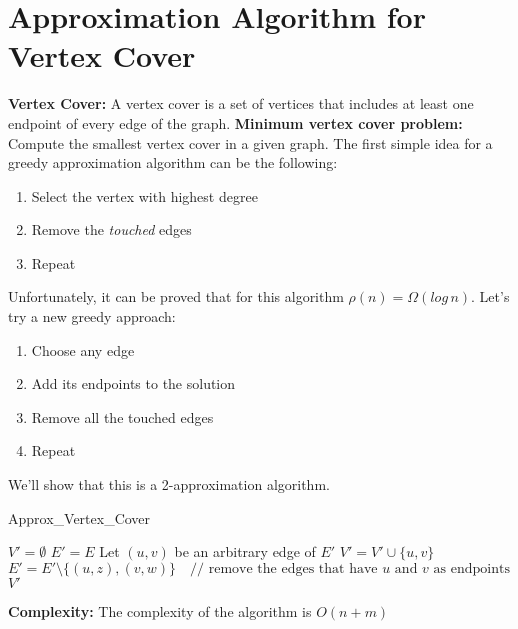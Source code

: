 \section{Approximation Algorithm for Vertex Cover}
\textbf{Vertex Cover:} A vertex cover is a set of vertices that includes at least one endpoint of every edge of the graph.\newline\newline
\textbf{Minimum vertex cover problem:} Compute the smallest vertex cover in a given graph.\newline\newline
The first simple idea for a greedy approximation algorithm can be the following:
\begin{enumerate}
    \item Select the vertex with highest degree
    \item Remove the \textit{touched} edges
    \item Repeat
\end{enumerate}
Unfortunately, it can be proved that for this algorithm $\rho(n) = \Omega(log\,n)$.\newline\newline
Let's try a new greedy approach:
\begin{enumerate}
    \item Choose any edge
    \item Add its endpoints to the solution
    \item Remove all the touched edges
    \item Repeat
\end{enumerate}
We'll show that this is a 2-approximation algorithm.

\begin{algorithm}
\caption{Approx\_Vertex\_Cover}\label{Approx_Vertex_Cover}
    \begin{algorithmic}[1]
        \State $V' = \emptyset$
        \State $E' = E$
            \State Let $(u, v)$ be an arbitrary edge of $E'$
            \State $V' = V' \cup \{u, v\}$
            \State $E' = E' \setminus \{(u, z), (v, w)\} \quad \text{// remove the edges that have $u$ and $v$ as endpoints}$
        \EndWhile
        \Return $V'$
    \EndProcedure   
\end{algorithmic}
\end{algorithm}
\textbf{Complexity:} The complexity of the algorithm is $O(n + m)$


